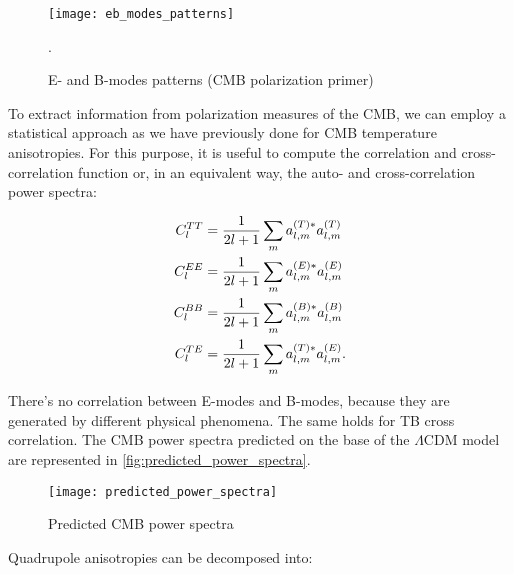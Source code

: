 \begin{figure}
        \centering
        \texttt{[image: eb\_modes\_patterns]}
        \caption{E- and B-modes patterns (CMB polarization primer)}
        \label{fig:eb_modes_patterns}.
\end{figure}

To extract information from polarization measures of the CMB, we can employ
a statistical approach as we have previously done for CMB temperature anisotropies.
For this purpose, it is useful to compute the correlation and cross-correlation
function or, in an equivalent way, the auto- and cross-correlation power
spectra:

\begin{align}
        C^{TT}_l & = \frac{1}{2l + 1}\sum_m
        a^{\qty(T)*}_{l,m} a^{\qty(T)}_{l,m} \\
        C^{EE}_l & = \frac{1}{2l + 1}\sum_m
        a^{\qty(E)*}_{l,m} a^{\qty(E)}_{l,m} \\
        C^{BB}_l & = \frac{1}{2l + 1}\sum_m
        a^{\qty(B)*}_{l,m} a^{\qty(B)}_{l,m} \\
        C^{TE}_l & = \frac{1}{2l + 1}\sum_m
        a^{\qty(T)*}_{l,m} a^{\qty(E)}_{l,m}.
\end{align}

There's no correlation between E-modes and B-modes, because they are
generated by different physical phenomena. The same holds for TB cross
correlation. The CMB power spectra predicted on the base of the
$\Lambda$CDM model are represented in
\autoref{fig:predicted_power_spectra}.

\begin{figure}
        \centering
        \texttt{[image: predicted\_power\_spectra]}
        \caption{Predicted CMB power spectra}
        \label{fig:predicted_power_spectra}
\end{figure}

Quadrupole anisotropies can be decomposed into:

